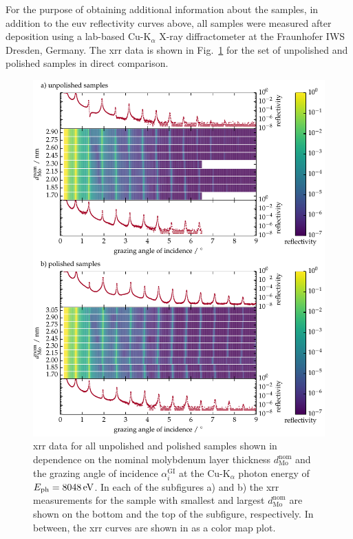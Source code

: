 For the purpose of obtaining additional information about the samples, in addition to the \gls{euv} reflectivity curves above, all samples were measured after deposition using a lab-based Cu-K$_\alpha$ X-ray diffractometer at the Fraunhofer IWS Dresden, Germany. The \gls{xrr} data is shown in Fig.~\ref{ch_spec:fig_MoSi_XRR} for the set of unpolished and polished samples in direct comparison.
\begin{figure}[htbp]
\centering
\includegraphics[width=\textwidth]{img/XRR_MoSi}
\caption{\gls{xrr} data for all unpolished and polished samples shown in dependence on the nominal molybdenum layer thickness $d_\text{Mo}^\text{nom}$ and the grazing angle of incidence $\alpha_i^\text{GI}$ at the Cu-K$_\alpha$ photon energy of $E_\text{ph} = \ev{8048}$. In each of the subfigures a) and b) the \gls{xrr} measurements for the sample with smallest and largest $d_\text{Mo}^\text{nom}$ are shown on the bottom and the top of the subfigure, respectively. In between, the \gls{xrr} curves are shown in as a color map plot.}
\label{ch_spec:fig_MoSi_XRR}
\end{figure}
